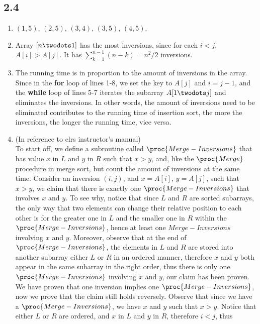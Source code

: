 \subsection{2.4}
\begin{enumerate}[leftmargin=*]
	\item $(1,5)$, $(2,5)$, $(3,4)$, $(3,5)$, $(4,5)$.
	\item Array $[n\twodots 1]$ has the most inversions,
		since for each $i<j$, $A[i]>A[j]$. It has 
	$\sum_{k=1}^{n-1}(n-k)=n^2/2$ inversions.
	\item The running time is in proportion to the
		amount of inversions in the array. Since in the
		\textbf{for} loop of lines 1-8, we set the key
		to $A[j]$ and $i=j-1$, and the \textbf{while}
		loop of lines 5-7 iterates the subarray
		$A[1\twodots j]$ and eliminates the inversions.
		In other words, the amount of inversions need
		to be eliminated contributes to the running
		time of insertion sort, the more the inversions,
		the longer the running time, vice versa.
	\item (In reference to clrs instructor's manual)\\
		To start off, we define a subroutine called 
		$\proc{Merge-Inversions}$ that has value $x$
		in $L$ and $y$ in $R$ such that $x>y$, and, 
		like the
		$\proc{Merge}$ procedure in merge sort, but
		count the amount of inversions at the same
		time. Consider an inversion $(i,j)$, and 
		$x=A[i]$, $y=A[j]$, such that $x>y$, 
		we claim that there is 
		exactly one $\proc{Merge-Inversions}$ that
		involves $x$ and $y$. To see why, notice that
		since $L$ and $R$ are sorted subarrays, the
		only way that two elements can change their
		relative position to each other is for the
		greater one in $L$ and the smaller one in
		$R$ within the $\proc{Merge-Inversions}$, hence 
		at least one $Merge-Inversions$ involving 
		$x$ and $y$. Moreover, observe that at the
		end of $\proc{Merge-Inversions}$, the elements in
		$L$ and $R$ are stored into another subarray
		either $L$ or $R$ in an ordered manner, 
		therefore $x$ and $y$ both appear in the same
		subarray in the right order, thus
		there is only one $\proc{Merge-Inversions}$ involving
		$x$ and $y$, our claim has been proven.\\
		We have proven that one inversion implies 
		one $\proc{Merge-Inversions}$, now we prove
		that the claim still holds reversely. Observe
		that since we have a $\proc{Merge-Inversions}$, 
		we have $x$ and $y$ such that $x>y$. Notice
		that either $L$ or $R$ are ordered, and $x$ 
		in $L$ and $y$ in $R$, therefore $i<j$, thus

\end{enumerate}
